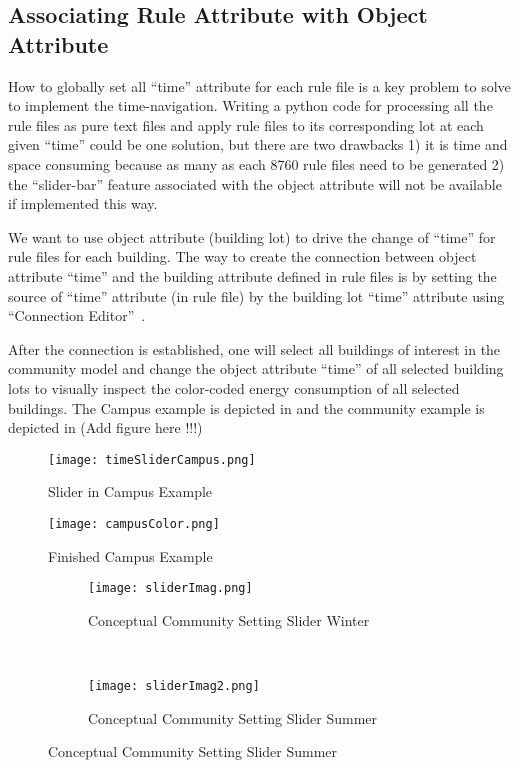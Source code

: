 \subsection{Associating Rule Attribute with Object Attribute}
How to globally set all ``time'' attribute for each rule file is a key
problem to solve to implement the time-navigation. Writing a python
code for processing all the rule files as pure text files and apply
rule files to its corresponding lot at each given ``time'' could be
one solution, but there are two drawbacks 1) it is time and space
consuming because as many as each 8760 rule files need to be
generated 2) the ``slider-bar'' feature associated with the object
attribute will not be available if implemented this way.

We want to use object attribute (building lot) to drive the change of
``time'' for rule files for each building. The way to create the
connection between object attribute ``time'' and the building
attribute defined in rule files is by setting the source of ``time''
attribute (in rule file) by the building lot ``time'' attribute using
``Connection Editor''~\cite{cityEngineAttConect2015}.

After the connection is established, one will select all buildings of
interest in the community model and change the object attribute
``time'' of all selected building lots to visually inspect the
color-coded energy consumption of all selected buildings. The Campus
example is depicted in  and the community
example is depicted in (Add figure here !!!)
\begin{figure}[h!]
  \centering
  \texttt{[image: timeSliderCampus.png]}
  \caption[Slider in Campus Example]{Slider in Campus Example}
  \label{fig:timeSliderCampus}
\end{figure}
\begin{figure}[h!]
  \centering
  \texttt{[image: campusColor.png]}
  \caption[Finished Campus Example]{Finished Campus Example}
  \label{fig:campusColor}
\end{figure}

\begin{figure}[h!]
  \centering
  \begin{subfigure}{0.7\textwidth}
  \centering
  \texttt{[image: sliderImag.png]}
  \caption[Conceptual Community Setting Slider Winter]{Conceptual
    Community Setting Slider Winter}
  \label{fig:sliderImag}
\end{subfigure}
~
\begin{subfigure}{0.7\textwidth}
  \centering
  \texttt{[image: sliderImag2.png]}
  \caption[Conceptual Community Setting Slider Summer]{Conceptual
    Community Setting Slider Summer}
  \label{fig:sliderImag2}
\end{subfigure}
\end{figure}



